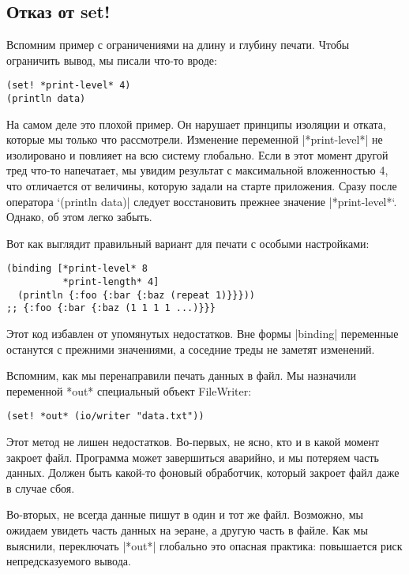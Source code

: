 \subsection{Отказ от set!}

Вспомним пример с ограничениями на длину и глубину печати. Чтобы ограничить
вывод, мы писали что-то вроде:

\begin{verbatim}
(set! *print-level* 4)
(println data)
\end{verbatim}

На самом деле это плохой пример. Он нарушает принципы изоляции и отката, которые
мы только что рассмотрели. Изменение переменной \spverb|*print-level*| не изолировано и
повлияет на всю систему глобально. Если в этот момент другой тред что-то
напечатает, мы увидим результат с максимальной вложенностью 4, что отличается от
величины, которую задали на старте приложения. Сразу после оператора `(println
data)\spverb| следует восстановить прежнее значение |*print-level*`. Однако, об этом
легко забыть.

Вот как выглядит правильный вариант для печати с особыми настройками:

\begin{verbatim}
(binding [*print-level* 8
          *print-length* 4]
  (println {:foo {:bar {:baz (repeat 1)}}}))
;; {:foo {:bar {:baz (1 1 1 1 ...)}}}
\end{verbatim}

Этот код избавлен от упомянутых недостатков. Вне формы \spverb|binding| переменные
останутся с прежними значениями, а соседние треды не заметят изменений.

Вспомним, как мы перенаправили печать данных в файл. Мы назначили переменной
*out* специальный объект FileWriter:

\begin{verbatim}
(set! *out* (io/writer "data.txt"))
\end{verbatim}

Этот метод не лишен недостатков. Во-первых, не ясно, кто и в какой момент
закроет файл. Программа может завершиться аварийно, и мы потеряем часть
данных. Должен быть какой-то фоновый обработчик, который закроет файл даже в
случае сбоя.

Во-вторых, не всегда данные пишут в один и тот же файл. Возможно, мы ожидаем
увидеть часть данных на эеране, а другую часть в файле. Как мы выяснили,
переключать \spverb|*out*| глобально это опасная практика: повышается риск
непредсказуемого вывода.

